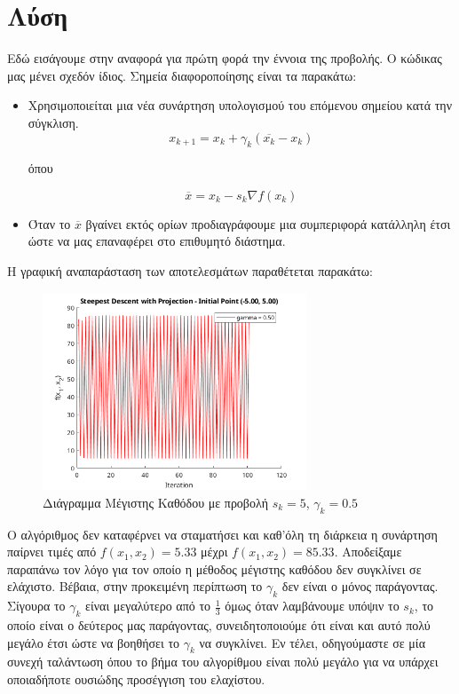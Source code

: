 \documentclass{report}
\begin{document}
\section{Λύση}
Εδώ εισάγουμε στην αναφορά για πρώτη φορά την έννοια της προβολής. Ο κώδικας μας μένει σχεδόν ίδιος.
Σημεία διαφοροποίησης είναι τα παρακάτω:
\begin{itemize}
    \item Χρησιμοποιείται μια νέα συνάρτηση υπολογισμού του επόμενου σημείου κατά την σύγκλιση.
    $$x_{k+1} = x_k + \gamma_k (\overline{x_k} - x_k)$$
    \centerline{όπου}
    $$\overline{x} = x_k - s_k \nabla f(x_k)$$
    \item Όταν το $\overline{x}$ βγαίνει εκτός ορίων προδιαγράφουμε μια συμπεριφορά κατάλληλη έτσι ώστε 
    να μας επαναφέρει στο επιθυμητό διάστημα.
\end{itemize}
Η γραφική αναπαράσταση των αποτελεσμάτων παραθέτεται παρακάτω:
\begin{figure}[H]
    \centering
    \includegraphics[width=0.7\textwidth]{media/thema2.png}
    \caption{Διάγραμμα Μέγιστης Καθόδου με προβολή $s_k = 5$, $\gamma_k = 0.5$}
\end{figure}
Ο αλγόριθμος δεν καταφέρνει να σταματήσει και καθ'όλη τη διάρκεια η συνάρτηση παίρνει τιμές από 
$f(x_1,x_2) = 5.33$ μέχρι $f(x_1,x_2) = 85.33$. Αποδείξαμε παραπάνω τον λόγο για τον οποίο η μέθοδος
μέγιστης καθόδου δεν συγκλίνει σε ελάχιστο. Βέβαια, στην προκειμένη περίπτωση το $\gamma_k$ δεν είναι
ο μόνος παράγοντας. Σίγουρα το $\gamma_k$ είναι μεγαλύτερο από το $\frac{1}{3}$ όμως όταν λαμβάνουμε 
υπόψιν το $s_k$, το οποίο είναι ο δεύτερος μας παράγοντας, συνειδητοποιούμε ότι είναι και αυτό πολύ 
μεγάλο έτσι ώστε να βοηθήσει το $\gamma_k$ να συγκλίνει. Εν τέλει, οδηγούμαστε σε μία συνεχή ταλάντωση 
όπου το βήμα του αλγορίθμου είναι πολύ μεγάλο για να υπάρχει οποιαδήποτε ουσιώδης προσέγγιση του ελαχίστου. 
\end{document}
